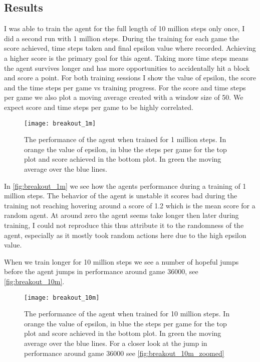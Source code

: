 \subsection{Results}
I was able to train the agent for the full length of 10 million steps only once, I did a second run with 1 million steps. During the training for each game the score achieved, time steps taken and final epsilon value where recorded. Achieving a higher score is the primary goal for this agent. Taking more time steps means the agent survives longer and has more opportunities to accidentally hit a block and score a point. For both training sessions I show the value of epsilon, the score and the time steps per game vs training progress. For the score and time steps per game we also plot a moving average created with a window size of 50. We expect score and time steps per game to be highly correlated. 

\begin{figure}
    \texttt{[image: breakout\_1m]}
    \caption{The performance of the agent when trained for 1 million steps. In orange the value of epsilon, in blue the steps per game for the top plot and score achieved in the bottom plot. In green the moving average over the blue lines.}
    \label{fig:breakout_1m}
\end{figure}

In \autoref{fig:breakout_1m} we see how the agents performance during a training of 1 million steps. The behavior of the agent is unstable it scores bad during the training not reaching hovering around a score of 1.2 which is the mean score for a random agent\cite{atari}. At around zero the agent seems take longer then later during training, I could not reproduce this thus attribute it to the randomness of the agent, especially as it mostly took random actions here due to the high epsilon value. 

When we train longer for 10 million steps we see a number of hopeful jumps before the agent jumps in performance around game $36000$, see \autoref{fig:breakout_10m}. 

\begin{figure}
    \texttt{[image: breakout\_10m]}
    \caption{The performance of the agent when trained for 10 million steps. In orange the value of epsilon, in blue the steps per game for the top plot and score achieved in the bottom plot. In green the moving average over the blue lines. For a closer look at the jump in performance around game $36000$ see \autoref{fig:breakout_10m_zoomed}}
    \label{fig:breakout_10m}
\end{figure}

